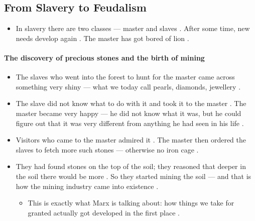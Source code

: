 \subsection{From Slavery to Feudalism}
\begin{itemize}
    \item In slavery there are two classes --- master and slaves . After some time, new needs develop again . The master has got bored of lion .
\end{itemize}

\paragraph{The discovery of precious stones and the birth of mining}
\begin{itemize}
    \item The slaves who went into the forest to hunt for the master came across something very shiny --- what we today call pearls, diamonds, jewellery .
    \item The slave did not know what to do with it and took it to the master . The master became very happy --- he did not know what it was, but he could figure out that it was very different from anything he had seen in his life .
    \item Visitors who came to the master admired it . The master then ordered the slaves to fetch more such stones --- otherwise no iron cage .
    \item They had found stones on the top of the soil; they reasoned that deeper in the soil there would be more . So they started mining the soil --- and that is how the mining industry came into existence .
    \begin{itemize}
        \item This is exactly what Marx is talking about: how things we take for granted actually got developed in the first place .
    \end{itemize}
\end{itemize}

